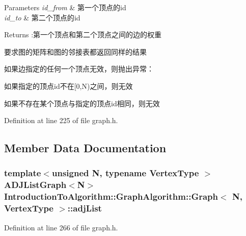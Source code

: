 \begin{DoxyParams}{Parameters}
{\em id\+\_\+from} & 第一个顶点的{\ttfamily id} \\
\hline
{\em id\+\_\+to} & 第二个顶点的{\ttfamily id} \\
\hline
\end{DoxyParams}
\begin{DoxyReturn}{Returns}
\+:第一个顶点和第二个顶点之间的边的权重
\end{DoxyReturn}
要求图的矩阵和图的邻接表都返回同样的结果

如果边指定的任何一个顶点无效，则抛出异常：


\begin{DoxyItemize}
\item 如果指定的顶点{\ttfamily id}不在{\ttfamily \mbox{[}0,N)}之间，则无效
\item 如果不存在某个顶点与指定的顶点{\ttfamily id}相同，则无效 
\end{DoxyItemize}

Definition at line 225 of file graph.\+h.



\subsection{Member Data Documentation}
\hypertarget{struct_introduction_to_algorithm_1_1_graph_algorithm_1_1_graph_a26d958d3e8e2bb20682d98b13b2d54fc}{}
\subsubsection[{adj\+List}]{\setlength{\rightskip}{0pt plus 5cm}template$<$unsigned N, typename Vertex\+Type $>$ {\bf A\+D\+J\+List\+Graph}$<$N$>$ {\bf Introduction\+To\+Algorithm\+::\+Graph\+Algorithm\+::\+Graph}$<$ N, Vertex\+Type $>$\+::adj\+List}\label{struct_introduction_to_algorithm_1_1_graph_algorithm_1_1_graph_a26d958d3e8e2bb20682d98b13b2d54fc}


Definition at line 266 of file graph.\+h.

\hypertarget{struct_introduction_to_algorithm_1_1_graph_algorithm_1_1_graph_abf4186d5ed3b2c93da5f7fef6342f987}{}
